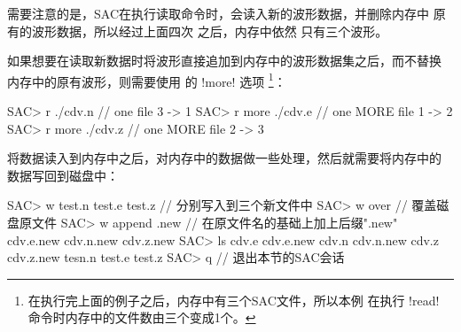 需要注意的是，SAC在执行读取命令时，会读入新的波形数据，并删除内存中
原有的波形数据，所以经过上面四次  之后，内存中依然
只有三个波形。

如果想要在读取新数据时将波形直接追加到内存中的波形数据集之后，而不替换
内存中的原有波形，则需要使用  的 !more! 选项
\footnote{在执行完上面的例子之后，内存中有三个SAC文件，所以本例
在执行 !read! 命令时内存中的文件数由三个变成1个。}：
\begin{SACCode}
SAC> r ./cdv.n              // one file       3 -> 1
SAC> r more ./cdv.e         // one MORE file  1 -> 2
SAC> r more ./cdv.z         // one MORE file  2 -> 3
\end{SACCode}

将数据读入到内存中之后，对内存中的数据做一些处理，然后就需要将内存中的
数据写回到磁盘中：
\begin{SACCode}
SAC> w test.n test.e test.z        // 分别写入到三个新文件中
SAC> w over                        // 覆盖磁盘原文件
SAC> w append .new                 // 在原文件名的基础上加上后缀".new"
cdv.e.new cdv.n.new cdv.z.new
SAC> ls
cdv.e cdv.e.new cdv.n cdv.n.new cdv.z cdv.z.new tesn.n test.e test.z
SAC> q                             // 退出本节的SAC会话
\end{SACCode}
